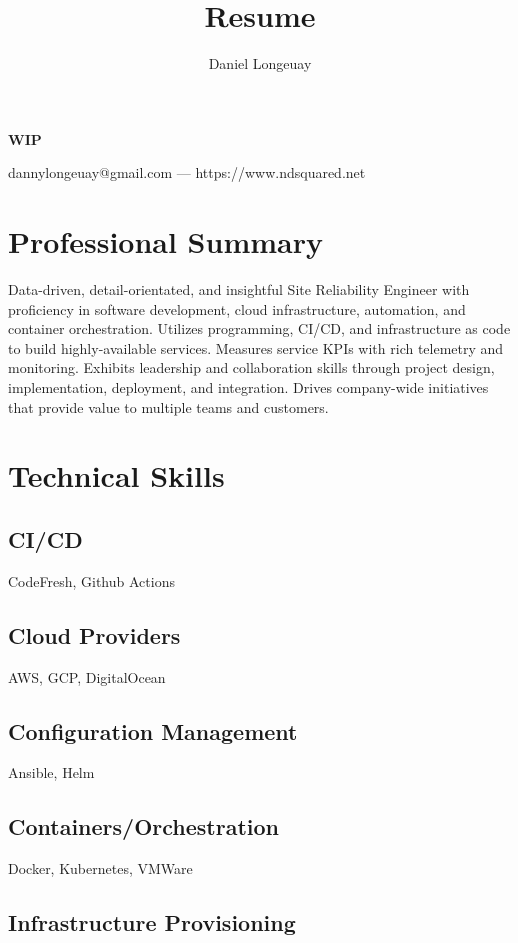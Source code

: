 \documentclass[letterpaper,11pt]{article}
\makeatletter
\renewcommand{\maketitle}{
  \begin{center}
    {\huge\bfseries WIP \theauthor}

    \vspace{.25em}

    {dannylongeuay@gmail.com --- https://www.ndsquared.net}
  \end{center}
}
\makeatother
\begin{document}
\title{Resume}
\author{Daniel Longeuay}

\maketitle

\section{Professional Summary}

Data-driven, detail-orientated, and insightful Site Reliability Engineer with proficiency in software
development, cloud infrastructure, automation, and container orchestration. Utilizes programming, CI/CD,
and infrastructure as code to build highly-available services. Measures service KPIs with rich telemetry
and monitoring. Exhibits leadership and collaboration skills through project design, implementation, 
deployment, and integration. Drives company-wide initiatives that provide value to multiple teams and customers.

\section{Technical Skills}

\subsection{CI/CD}

CodeFresh, Github Actions

\subsection{Cloud Providers}

AWS, GCP, DigitalOcean

\subsection{Configuration Management}

Ansible, Helm

\subsection{Containers/Orchestration}

Docker, Kubernetes, VMWare

\subsection{Infrastructure Provisioning}
\end{document}
